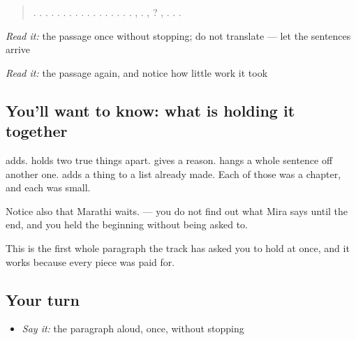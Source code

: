 \begin{tcolorbox}[breakable,skin=enhanced,colback=orange!6,colframe=orange!45!black,boxrule=0.5pt,arc=1mm,left=6pt,right=6pt,top=4pt,bottom=4pt,fonttitle=\bfseries,title={Read this}]
\begin{quote}
   .   .    .    .      .   .    .   .    .    .    .      .        .    .   .     .      .    ,   .  , ?  , .  . .
\end{quote}

\emph{Read it:} the passage once without stopping; do not translate — let the sentences arrive

\emph{Read it:} the passage again, and notice how little work it took
\end{tcolorbox}

\subsection*{You'll want to know: what is holding it together}
\textbf{} adds. \textbf{} holds two true things apart. \textbf{} gives a reason. \textbf{} hangs a whole sentence off another one. \textbf{} adds a thing to a list already made. Each of those was a chapter, and each was small.

Notice also that Marathi waits. \textbf{     } — you do not find out what Mira says until the end, and you held the beginning without being asked to.

This is the first whole paragraph the track has asked you to hold at once, and it works because every piece was paid for.

\subsection*{Your turn}
\begin{itemize}
\raggedright
  \item \emph{Say it:} the paragraph aloud, once, without stopping
\end{itemize}

